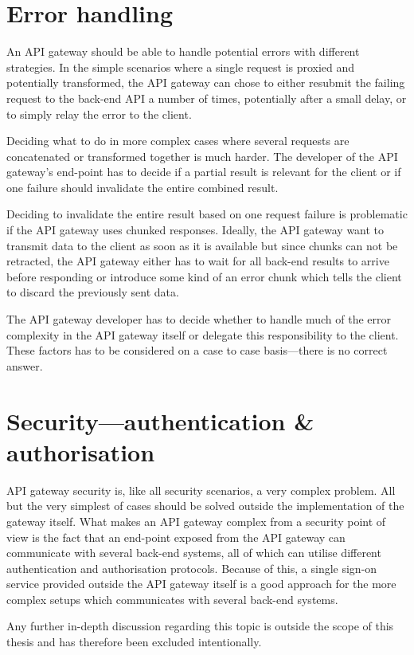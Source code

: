 \documentclass{cslthse-msc}
\begin{document}
\section{Error handling}
An API gateway should be able to handle potential errors with different strategies. In the simple scenarios where a single request is proxied and potentially transformed, the API gateway can chose to either resubmit the failing request to the back-end API a number of times, potentially after a small delay, or to simply relay the error to the client.

Deciding what to do in more complex cases where several requests are concatenated or transformed together is much harder. The developer of the API gateway's end-point has to decide if a partial result is relevant for the client or if one failure should invalidate the entire combined result.

Deciding to invalidate the entire result based on one request failure is problematic if the API gateway uses chunked responses. Ideally, the API gateway want to transmit data to the client as soon as it is available but since chunks can not be retracted, the API gateway either has to wait for all back-end results to arrive before responding or introduce some kind of an error chunk which tells the client to discard the previously sent data.

The API gateway developer has to decide whether to handle much of the error complexity in the API gateway itself or delegate this responsibility to the client. These factors has to be considered on a case to case basis---there is no correct answer.

\section{Security---authentication \& authorisation}
\label{sec:security}
API gateway security is, like all security scenarios, a very complex problem. All but the very simplest of cases should be solved outside the implementation of the gateway itself. What makes an API gateway complex from a security point of view is the fact that an end-point exposed from the API gateway can communicate with several back-end systems, all of which can utilise different authentication and authorisation protocols. Because of this, a single sign-on service provided outside the API gateway itself is a good approach for the more complex setups which communicates with several back-end systems.

Any further in-depth discussion regarding this topic is outside the scope of this thesis and has therefore been excluded intentionally.
\end{document}
